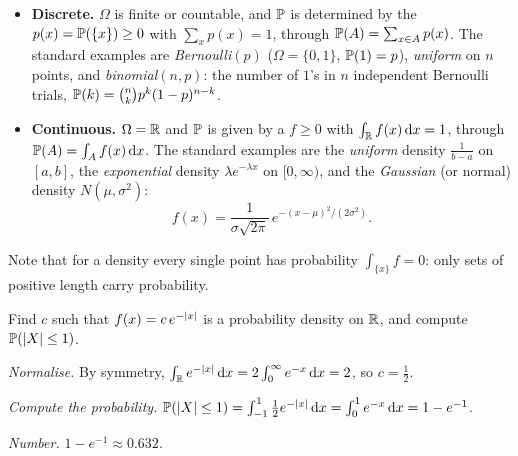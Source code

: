 \begin{itemize}
  \item \textbf{Discrete.} $\Omega$ is finite or countable, and $\mathbb{P}$ is determined by the  $p(x)=\mathbb{P}(\{x\})\ge0$ with $\sum_xp(x)=1$, through $\mathbb{P}(A)=\sum_{x\in A}p(x)$.
    The standard examples are \emph{Bernoulli}$(p)$ ($\Omega=\{0,1\}$, $\mathbb{P}(1)=p$), \emph{uniform} on $n$ points, and \emph{binomial}$(n,p)$: the number of $1$'s in $n$ independent Bernoulli trials,
    $\mathbb{P}(k)=\binom nkp^k(1-p)^{n-k}$.
  \item \textbf{Continuous.} $\Omega=\mathbb{R}$ and $\mathbb{P}$ is given by a  $f\ge0$ with $\int_{\mathbb{R}}f(x)\,\mathrm{d} x=1$, through $\mathbb{P}(A)=\int_Af(x)\,\mathrm{d} x$.
    The standard examples are the \emph{uniform} density $\frac1{b-a}$ on $[a,b]$, the \emph{exponential} density $\lambda e^{-\lambda x}$ on $[0,\infty)$, and the \emph{Gaussian} (or normal) density $N(\mu,\sigma^2)$:
    \[
      f(x)=\frac{1}{\sigma\sqrt{2\pi}}\,e^{-(x-\mu)^2/(2\sigma^2)} .
    \]
\end{itemize}
Note that for a density every single point has probability $\int_{\{x\}}f=0$: only sets of positive length carry probability.

\begin{example}\label{ex:laplace}
  Find $c$ such that $f(x)=c\,e^{-\left|x\right|}$ is a probability density on $\mathbb{R}$, and compute $\mathbb{P}(\left|X\right|\le1)$.
\end{example}
\begin{solution}
  \begin{steps}
    \item \emph{Normalise.} By symmetry, $\int_{\mathbb{R}}e^{-\left|x\right|}\,\mathrm{d} x=2\int_0^\infty e^{-x}\,\mathrm{d} x=2$, so $c=\tfrac12$.
    \item \emph{Compute the probability.} $\mathbb{P}(\left|X\right|\le1)=\int_{-1}^1\tfrac12e^{-\left|x\right|}\,\mathrm{d} x=\int_0^1e^{-x}\,\mathrm{d} x=1-e^{-1}$.
    \item \emph{Number.} $1-e^{-1}\approx0.632$.
  \end{steps}
\end{solution}

